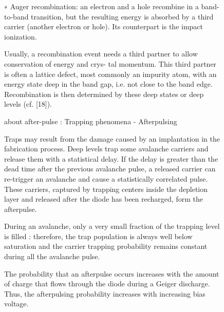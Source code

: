 \begin{figure}[!hbtp]
{{  ∗ Auger recombination: an electron and a hole recombine in a band-to-band transition,
  but the resulting energy is absorbed by a third carrier (another electron or hole). Its
  counterpart is the impact ionization.
  
  Usually, a recombination event needs a third partner to allow conservation of energy and crys-
  tal momentum. This third partner is often a lattice defect, most commonly an impurity atom,
  with an energy state deep in the band gap, i.e. not close to the band edge. Recombination is
  then determined by these deep states or deep levels (cf. [18]).
  
  about after-pulse : Trapping phenomena - Afterpulsing

  Traps may result from the damage caused by an implantation in the fabrication process.
  Deep levels trap some avalanche carriers and release them with a statistical delay. If the
  delay is greater than the dead time after the previous avalanche pulse, a released carrier can
  re-trigger an avalanche and cause a statistically correlated pulse. 
  These carriers, captured by trapping centers inside the depletion layer and released after the diode has been recharged,
  form the afterpulse. 
  
  During an avalanche, only a very small fraction of the trapping level is filled : therefore, the trap population is always well below saturation and 
  the carrier trapping probability remains constant during all the avalanche pulse. 
  
  The probability that an afterpulse occurs increases with the amount of charge that flows through the diode during a Geiger
  discharge. Thus, the afterpulsing probability increases with increasing bias voltage.
  
   
  
  

  
  
  
  
  
}}
\end{figure}
